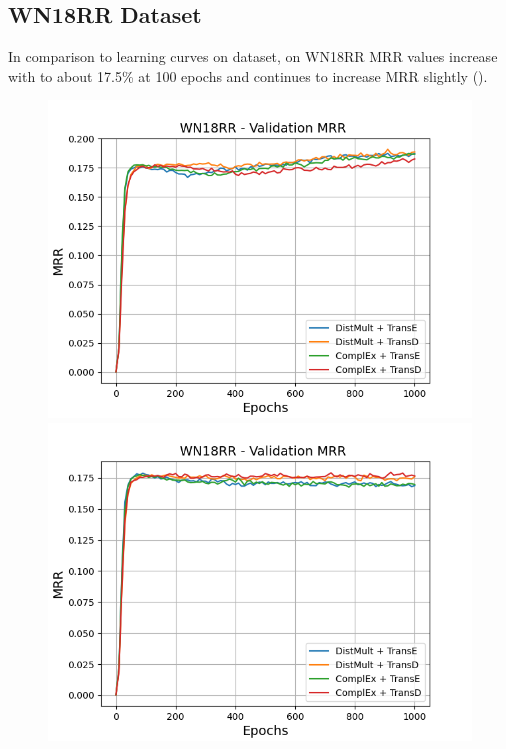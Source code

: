 \subsection{WN18RR Dataset}
\label{subsec:uncertainty_wn18rr}

In comparison to learning curves on \umls dataset, on \textsc{WN18RR} MRR values increase with \origsampling to about 17.5\% at 100 epochs and continues to increase MRR slightly ().
\begin{figure}
    \centering
    \begin{minipage}{.5\textwidth}
      \centering
      \includegraphics[width=0.9\linewidth]{figures/results/gan_train/not_pretrained/random/wn18rr/epochs1000/random_wn18rr_mrrs.png}
    \end{minipage}%
    \begin{minipage}{.5\textwidth}
      \centering
      \includegraphics[width=0.9\linewidth]{figures/results/gan_train/not_pretrained/uncertainty/max_distribution/entropy/wn18rr/1k_epochs/uncertainty_wn18rr_mrrs.png}

\end{minipage}
\end{figure}
